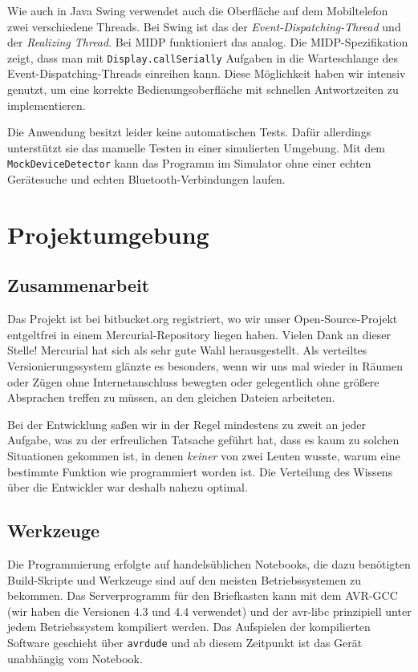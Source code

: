 \documentclass[ngerman]{article}
\begin{document}
Wie auch in Java Swing verwendet auch die Oberfläche auf dem Mobiltelefon zwei
verschiedene Threads. Bei Swing ist das der \textit{Event-Dispatching-Thread}
und der \textit{Realizing Thread}.  Bei MIDP funktioniert das analog. Die
MIDP-Spezifikation zeigt, dass man mit {\tt Display.callSerially} Aufgaben in
die Warteschlange des Event-Dispatching-Threads einreihen kann. Diese
Möglichkeit haben wir intensiv genutzt, um eine korrekte Bedienungsoberfläche
mit schnellen Antwortzeiten zu implementieren.

Die Anwendung besitzt leider keine automatischen Tests. Dafür allerdings
unterstützt sie das manuelle Testen in einer simulierten Umgebung. Mit
dem {\tt MockDeviceDetector} kann das Programm im Simulator ohne
einer echten Ge\-rä\-te\-suche und echten Bluetooth-Verbindungen laufen.

\section{Projektumgebung}

\subsection{Zusammenarbeit}

Das Projekt ist bei bitbucket.org registriert, wo wir unser Open-Source-Projekt
entgeltfrei in einem Mercurial-Repository liegen haben. Vielen Dank an dieser
Stelle!  Mercurial hat sich als sehr gute Wahl herausgestellt. Als verteiltes
Versionierungssystem glänzte es besonders, wenn wir uns mal wieder in Räumen
oder Zügen ohne Internetanschluss bewegten oder gelegentlich ohne größere
Absprachen treffen zu müssen, an den gleichen Dateien arbeiteten.

Bei der Entwicklung saßen wir in der Regel mindestens zu zweit an jeder
Aufgabe, was zu der erfreulichen Tatsache geführt hat, dass es kaum zu solchen
Situationen gekommen ist, in denen \textit{keiner} von zwei Leuten wusste,
warum eine bestimmte Funktion wie programmiert worden ist. Die Verteilung des
Wissens über die Entwickler war deshalb nahezu optimal.

\subsection{Werkzeuge}

Die Programmierung erfolgte auf handelsüblichen Notebooks, die dazu benötigten
Build-Skripte und Werkzeuge sind auf den meisten Betriebssystemen zu bekommen.
Das Serverprogramm für den Briefkasten kann mit dem AVR-GCC (wir haben die
Versionen 4.3 und 4.4 verwendet) und der avr-libc
prinzipiell unter jedem Betriebssystem kompiliert werden. Das Aufspielen der
kompilierten Software geschieht über \texttt{avrdude} und ab diesem Zeitpunkt ist das
Gerät unabhängig vom Notebook.
\end{document}
